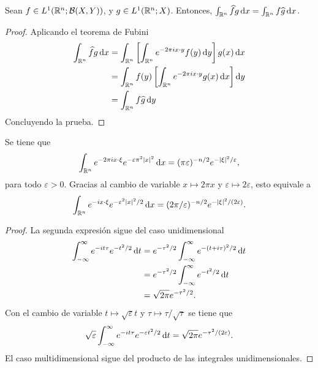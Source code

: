 \begin{lemma}
    Sean $f\in L^1(\mathbb{R}^n;\mathcal{B}(X, Y))$, y $g \in L^1(\mathbb{R}^n;X)$. Entonces, $\int_{\mathbb{R}^n}\widehat{f} g \mathop{}\!\mathrm{d} x 
    = \int_{\mathbb{R}^n} f \widehat{g} \mathop{}\!\mathrm{d} x$.
\end{lemma}
\begin{proof}
    Aplicando el teorema de Fubini 
    \begin{align*}
        \int_{\mathbb{R}^n}\widehat{f} g \mathop{}\!\mathrm{d} x & = \int_{\mathbb{R}^n} \left[
            \int_{\mathbb{R}^n} e^{-2\pi i x\cdot y} f(y) \mathop{}\!\mathrm{d} y
        \right] g(x) \mathop{}\!\mathrm{d} x \\
        & = \int_{\mathbb{R}^n} f(y)\left[
            \int_{\mathbb{R}^n} e^{-2\pi i x\cdot y} g(x) \mathop{}\!\mathrm{d} x
        \right] \mathop{}\!\mathrm{d} y \\ 
        & = \int_{\mathbb{R}^n} f \widehat{g} \mathop{}\!\mathrm{d} y
    \end{align*}
    Concluyendo la prueba.
\end{proof}
\begin{lemma}
    Se tiene que
    \begin{equation*}
       \int_{\mathbb{R}^n} e^{-2\pi i x \cdot \xi} e^{-\varepsilon\pi^2|x|^2}
        \mathop{}\!\mathrm{d} x = (\pi\varepsilon)^{-n/2} e^{-|\xi|^2/\varepsilon},  
    \end{equation*}
    para todo $\varepsilon > 0$. Gracias al cambio de variable 
    $x \mapsto 2\pi x$ y $\varepsilon \mapsto 2\varepsilon$, esto equivale a
    \begin{equation*}
       \int_{\mathbb{R}^n} e^{- i x \cdot \xi} e^{-\varepsilon^2|x|^2/2}
        \mathop{}\!\mathrm{d} x = (2\pi/\varepsilon)^{-n/2} e^{-|\xi|^2/(2\varepsilon)}. 
    \end{equation*}
\end{lemma}
\begin{proof}
    La segunda expresión sigue del caso unidimensional
    \begin{align*}
        \int_{-\infty}^{\infty} e^{-it\tau}e^{-t^2/2} \mathop{}\!\mathrm{d} t & = 
        e^{-\tau^2/2} \int_{-\infty}^{\infty} e^{-(t+i\tau)^2/2} \mathop{}\!\mathrm{d} t \\
        & = e^{-\tau^2/2} \int_{-\infty}^{\infty} e^{-t^2/2} \mathop{}\!\mathrm{d} t \\
        & = \sqrt{2\pi} e^{-\tau^2/2}.
    \end{align*}
    Con el cambio de variable $t\mapsto\sqrt{\varepsilon}t$ y 
    $\tau\mapsto\tau/\sqrt{\tau}$ se tiene que 
    \begin{equation*}
        \sqrt{\varepsilon}\int_{-\infty}^{\infty} e^{-it\tau}e^{-\varepsilon t^2/2} 
        \mathop{}\!\mathrm{d} t = 
        \sqrt{2\pi} e^{-\tau^2/(2\varepsilon)}.
    \end{equation*}
    El caso multidimensional sigue del producto de las integrales unidimensionales.
\end{proof}
